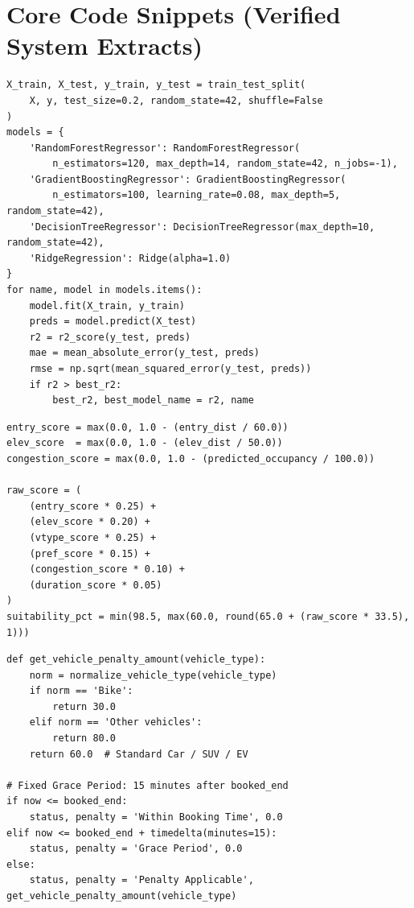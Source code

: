 \documentclass[12pt,a4paper,oneside]{report}
\begin{document}
\section{Core Code Snippets (Verified System Extracts)}

\begin{lstlisting}[caption={ML Training and Benchmarking Pipeline (Excerpt from \texttt{core/ml\_engine.py})},label={lst:ml_train}]
X_train, X_test, y_train, y_test = train_test_split(
    X, y, test_size=0.2, random_state=42, shuffle=False
)
models = {
    'RandomForestRegressor': RandomForestRegressor(
        n_estimators=120, max_depth=14, random_state=42, n_jobs=-1),
    'GradientBoostingRegressor': GradientBoostingRegressor(
        n_estimators=100, learning_rate=0.08, max_depth=5, random_state=42),
    'DecisionTreeRegressor': DecisionTreeRegressor(max_depth=10, random_state=42),
    'RidgeRegression': Ridge(alpha=1.0)
}
for name, model in models.items():
    model.fit(X_train, y_train)
    preds = model.predict(X_test)
    r2 = r2_score(y_test, preds)
    mae = mean_absolute_error(y_test, preds)
    rmse = np.sqrt(mean_squared_error(y_test, preds))
    if r2 > best_r2:
        best_r2, best_model_name = r2, name
\end{lstlisting}

\begin{lstlisting}[caption={Multi-Criteria Slot Suitability Scoring (Excerpt from \texttt{core/recommendation\_engine.py})},label={lst:suitability}]
entry_score = max(0.0, 1.0 - (entry_dist / 60.0))
elev_score  = max(0.0, 1.0 - (elev_dist / 50.0))
congestion_score = max(0.0, 1.0 - (predicted_occupancy / 100.0))

raw_score = (
    (entry_score * 0.25) +
    (elev_score * 0.20) +
    (vtype_score * 0.25) +
    (pref_score * 0.15) +
    (congestion_score * 0.10) +
    (duration_score * 0.05)
)
suitability_pct = min(98.5, max(60.0, round(65.0 + (raw_score * 33.5), 1)))
\end{lstlisting}

\begin{lstlisting}[caption={Overstay Grace Period & Vehicle-Tiered Penalty Calculation (\texttt{core/overstay\_engine.py})},label={lst:overstay}]
def get_vehicle_penalty_amount(vehicle_type):
    norm = normalize_vehicle_type(vehicle_type)
    if norm == 'Bike':
        return 30.0
    elif norm == 'Other vehicles':
        return 80.0
    return 60.0  # Standard Car / SUV / EV

# Fixed Grace Period: 15 minutes after booked_end
if now <= booked_end:
    status, penalty = 'Within Booking Time', 0.0
elif now <= booked_end + timedelta(minutes=15):
    status, penalty = 'Grace Period', 0.0
else:
    status, penalty = 'Penalty Applicable', get_vehicle_penalty_amount(vehicle_type)
\end{lstlisting}
\end{document}
